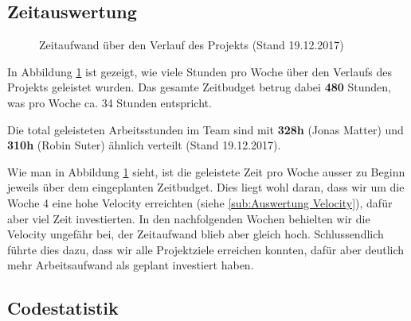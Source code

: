 \subsection{Zeitauswertung}
\label{sub:Zeitauswertung}

\begin{figure}[H]
    \centering

    \caption[Diagramm Zeitaufwand über den Verlauf des Projekts]{Zeitaufwand über den Verlauf des Projekts (Stand 19.12.2017)}
    \label{chart:Zeitauswertung}
\end{figure}

In Abbildung \ref{chart:Zeitauswertung} ist gezeigt, wie viele Stunden pro Woche über den Verlaufs des Projekts geleistet wurden. Das gesamte Zeitbudget betrug dabei \textbf{480} Stunden, was pro Woche ca. 34 Stunden entspricht.

Die total geleisteten Arbeitsstunden im Team sind mit \textbf{328h} (Jonas Matter) und \textbf{310h} (Robin Suter) ähnlich verteilt (Stand 19.12.2017).

Wie man in Abbildung \ref{chart:Zeitauswertung} sieht, ist die geleistete Zeit pro Woche ausser zu Beginn jeweils über dem eingeplanten Zeitbudget. Dies liegt wohl daran, dass wir um die Woche 4 eine hohe Velocity erreichten (siehe \ref{sub:Auswertung Velocity}), dafür aber viel Zeit investierten. In den nachfolgenden Wochen behielten wir die Velocity ungefähr bei, der Zeitaufwand blieb aber gleich hoch. Schlussendlich führte dies dazu, dass wir alle Projektziele erreichen konnten, dafür aber deutlich mehr Arbeitsaufwand als geplant investiert haben.

\subsection{Codestatistik}
\label{sub:Codestatistik}

